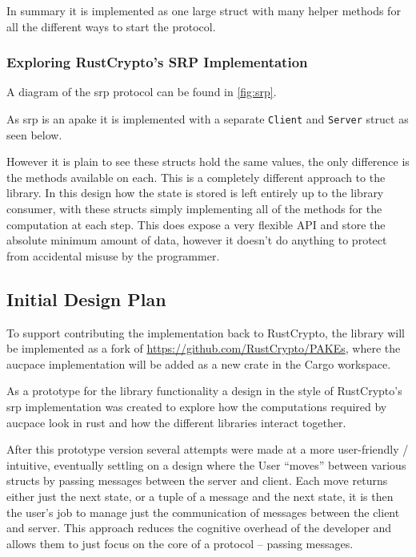 In summary it is implemented as one large struct with many helper methods for all the different ways to start the protocol.

\subsubsection{Exploring RustCrypto's SRP Implementation}
A diagram of the \gls{srp} protocol can be found in \cref{fig:srp}.

As \gls{srp} is an \gls{apake} it is implemented with a separate \texttt{Client} and \texttt{Server} struct as seen below.


However it is plain to see these structs hold the same values, the only difference is the methods available on each.
This is a completely different approach to the  library.
In this design how the state is stored is left entirely up to the library consumer, with these structs simply implementing all of the methods for the computation at each step.
This does expose a very flexible API and store the absolute minimum amount of data, however it doesn't do anything to protect from accidental misuse by the programmer.

\subsection{Initial Design Plan}
To support contributing the implementation back to RustCrypto, the library will be implemented as a fork of \url{https://github.com/RustCrypto/PAKEs},
where the \gls{aucpace} implementation will be added as a new crate in the Cargo workspace.

As a prototype for the library functionality a design in the style of RustCrypto's \gls{srp} implementation was created to explore how the computations required by \gls{aucpace} look in rust and how the different libraries interact together.

After this prototype version several attempts were made at a more user-friendly / intuitive, eventually settling on a design where the User \enquote{moves} between various structs by passing messages between the server and client.
Each move returns either just the next state, or a tuple of a message and the next state, it is then the user's job to manage just the communication of messages between the client and server.
This approach reduces the cognitive overhead of the developer and allows them to just focus on the core of a protocol -- passing messages.

